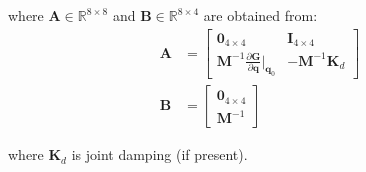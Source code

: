\documentclass[12pt]{article}
\begin{document}
where $\mathbf{A} \in \mathbb{R}^{8 \times 8}$ and $\mathbf{B} \in \mathbb{R}^{8 \times 4}$ are obtained from:
\begin{align}
    \mathbf{A} &= \begin{bmatrix}
        \mathbf{0}_{4 \times 4} & \mathbf{I}_{4 \times 4} \\
        \mathbf{M}^{-1}\frac{\partial \mathbf{G}}{\partial \mathbf{q}}\bigg|_{\mathbf{q}_0} & -\mathbf{M}^{-1}\mathbf{K}_d
    \end{bmatrix} \\
    \mathbf{B} &= \begin{bmatrix}
        \mathbf{0}_{4 \times 4} \\
        \mathbf{M}^{-1}
    \end{bmatrix}
\end{align}

where $\mathbf{K}_d$ is joint damping (if present).
\end{document}
